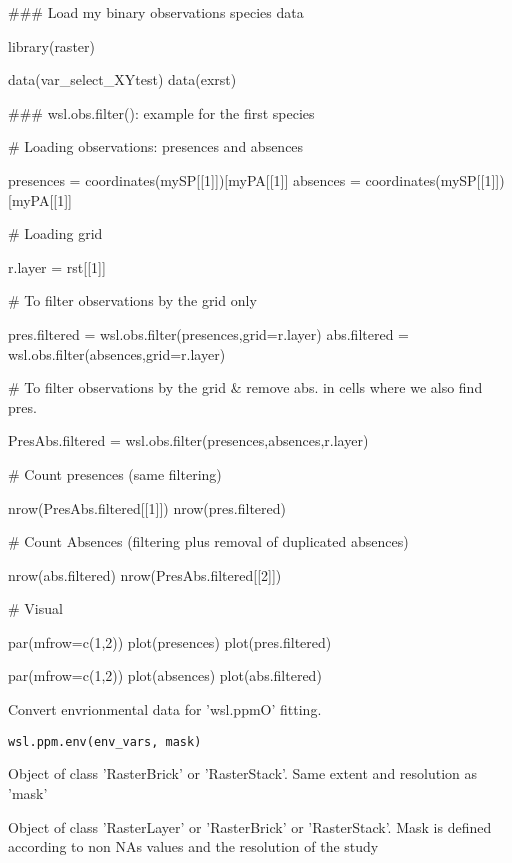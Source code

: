 \documentclass[a4paper]{book}
\begin{document}
\begin{Examples}
\begin{ExampleCode}

### Load my binary observations species data

library(raster)

data(var_select_XYtest)
data(exrst)

### wsl.obs.filter(): example for the first species

   # Loading observations: presences and absences

presences = coordinates(mySP[[1]])[myPA[[1]] %
absences = coordinates(mySP[[1]])[myPA[[1]] %

   # Loading grid

r.layer = rst[[1]]

   # To filter observations by the grid only

pres.filtered = wsl.obs.filter(presences,grid=r.layer)
abs.filtered = wsl.obs.filter(absences,grid=r.layer)

   # To filter observations by the grid & remove abs. in cells where we also find pres.

PresAbs.filtered = wsl.obs.filter(presences,absences,r.layer)

   # Count presences (same filtering)

nrow(PresAbs.filtered[[1]])
nrow(pres.filtered)

   # Count Absences (filtering plus removal of duplicated absences)

nrow(abs.filtered)
nrow(PresAbs.filtered[[2]])

   # Visual

par(mfrow=c(1,2))
plot(presences)
plot(pres.filtered)

par(mfrow=c(1,2))
plot(absences)
plot(abs.filtered)

\end{ExampleCode}
\end{Examples}
%
\begin{Description}\relax
Convert envrionmental data for 'wsl.ppmO' fitting.
\end{Description}
%
\begin{Usage}
\begin{verbatim}
wsl.ppm.env(env_vars, mask)
\end{verbatim}
\end{Usage}
%
\begin{Arguments}
\begin{ldescription}
\item[\code{env\_vars}] Object of class 'RasterBrick' or 'RasterStack'. Same extent and resolution as 'mask'

\item[\code{mask}] Object of class 'RasterLayer' or 'RasterBrick' or 'RasterStack'. Mask is defined
according to non NAs values and the resolution of the study
\end{ldescription}
\end{Arguments}
\end{document}
